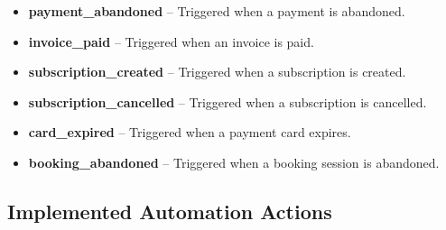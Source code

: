 \documentclass[12pt,a4paper]{article}
\begin{document}
\begin{itemize}[leftmargin=2em]
    \item \textbf{payment\_abandoned} -- Triggered when a payment is abandoned.
    \item \textbf{invoice\_paid} -- Triggered when an invoice is paid.
    \item \textbf{subscription\_created} -- Triggered when a subscription is created.
    \item \textbf{subscription\_cancelled} -- Triggered when a subscription is cancelled.
    \item \textbf{card\_expired} -- Triggered when a payment card expires.
    \item \textbf{booking\_abandoned} -- Triggered when a booking session is abandoned.
\end{itemize}

\subsection*{Implemented Automation Actions}
\end{document}

